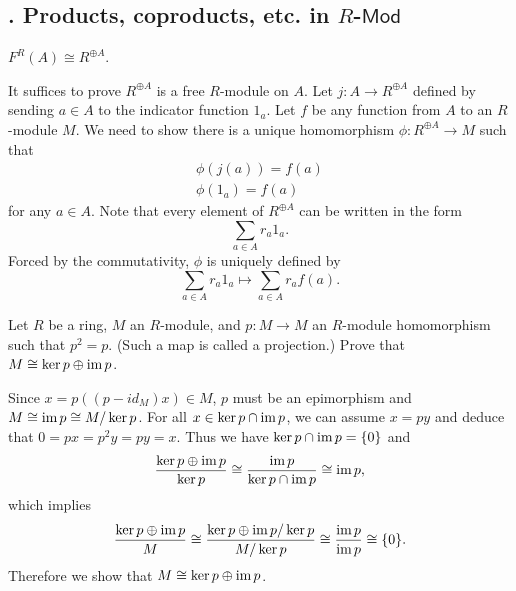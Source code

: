 \documentclass[12pt,letterpaper,boxed]{hmcpset}
\newcommand{\im}{\mathrm{im}\hspace{1.5pt}}
\newcommand{\Mod}{\mathsf{Mod}}
\begin{document}
\subsection{. Products, coproducts, etc. in $R$-$\Mod$}
\begin{problem}[6.1]
    $F^{R}(A)\cong R^{\oplus A}$.
\end{problem}
\begin{solution}
    It suffices to prove $R^{\oplus A}$ is a free $R$-module on $A$. Let $j: A\to R^{\oplus A}$ defined by sending $a\in A$ to the indicator function $1_a$.  Let $f$ be any function from $A$ to an $R$-module $M$. We need to show there is a unique homomorphism $\phi: R^{\oplus A}\to M$ such that
    \begin{align*}
    \phi (j(a)) = f(a)\\
    \phi(1_a) =f(a)
    \end{align*}
for any $a\in A$. Note that every element of $R^{\oplus A}$ can be written in the form
    \[\sum_{a\in A}{r_a}1_a.\]
Forced by the commutativity, $\phi$ is uniquely defined by 
\[
\sum_{a\in A}{r_a}1_a\mapsto \sum_{a\in A}{r_a}f(a).
\]
\end{solution}

\begin{problem}[6.3]
Let $R$ be a ring, $M$ an $R$-module, and $p : M \to M$ an $R$-module homomorphism such that $p^2 = p$. (Such a map is called a projection.) Prove that $M\cong\ker p \oplus\im p$.
\end{problem}
\begin{solution}
Since $x=p((p-id_M)x)\in M$, $p$ must be an epimorphism and $M\cong\im p\cong M/\ker p$. For all $x\in\ker p \cap \im p$, we can assume $x=py$ and deduce that $0=px=p^2y=py=x$. Thus we have $\ker p \cap \im p=\{0\}$ and
\[
\frac{\ker p \oplus\im p}{\ker p}\cong\frac{\im p}{\ker p \cap \im p}\cong\im p,
\]
which implies
\[
\frac{\ker p \oplus\im p}{M}\cong\frac{\ker p \oplus\im p/\ker p}{M/\ker p}\cong\frac{\im p}{ \im p}\cong\{0\}.
\]
Therefore we show that $M\cong\ker p \oplus\im p$.
\end{solution}
\end{document}
